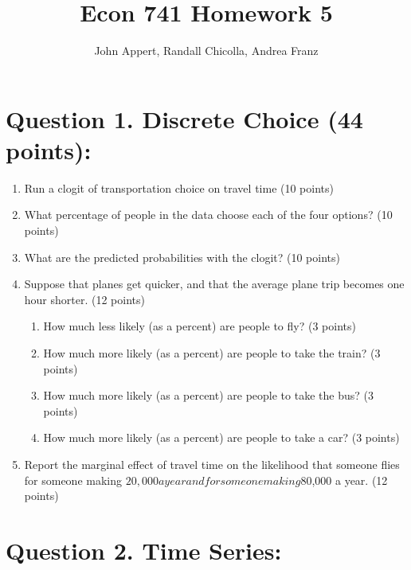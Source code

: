 \documentclass{article}
\begin{document}
\title{Econ 741 Homework 5}
\author{John Appert, Randall Chicolla, Andrea Franz}
\maketitle


\section{Question 1. Discrete Choice (44 points):}

\begin{enumerate}
\item Run a clogit of transportation choice on travel time (10 points)
\item What percentage of people in the data choose each of the four options? (10 points)
\item What are the predicted probabilities with the clogit? (10 points)
\item Suppose that planes get quicker, and that the average plane trip becomes one
hour shorter. (12 points)
\begin{enumerate}
\item How much less likely (as a percent) are people to fly? (3 points)
\item How much more likely (as a percent) are people to take the train? (3 points)
\item How much more likely (as a percent) are people to take the bus? (3 points)
\item How much more likely (as a percent) are people to take a car? (3 points)
\end{enumerate}
\item Report the marginal effect of travel time on the likelihood that someone flies for someone making $20,000 a year and for someone making $80,000 a year. (12 points)
\end{enumerate}

\section{Question 2. Time Series: }
\end{document}
